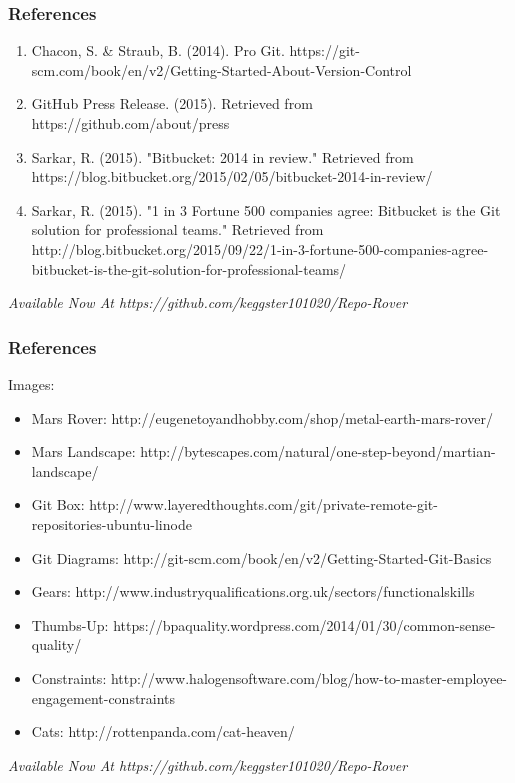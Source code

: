 \begin{frame}
    \centering
    \frametitle{References}
	\fontsize{9}{7.2}
	\begin{enumerate}
		\item Chacon, S. \& Straub, B.  (2014).  Pro Git.  https://git-scm.com/book/en/v2/Getting-Started-About-Version-Control
		\item GitHub Press Release.  (2015).  Retrieved from https://github.com/about/press
		\item Sarkar, R.  (2015).  "Bitbucket: 2014 in review."  Retrieved from https://blog.bitbucket.org/2015/02/05/bitbucket-2014-in-review/
		\item Sarkar, R.  (2015).  "1 in 3 Fortune 500 companies agree: Bitbucket is the Git solution for professional teams."  Retrieved from http://blog.bitbucket.org/2015/09/22/1-in-3-fortune-500-companies-agree-bitbucket-is-the-git-solution-for-professional-teams/
	\end{enumerate}	

	\vspace{1.5cm}	
	
	\begin{block}{}
    \begin{center}
    \emph{\Large{Available Now At \emph{https://github.com/keggster101020/Repo-Rover}}}
    \end{center}
    \end{block}
    
\end{frame}

\begin{frame}
    \centering
    \frametitle{References}
	\fontsize{9}{7.2}
	Images:
	\begin{itemize}
		\item Mars Rover: http://eugenetoyandhobby.com/shop/metal-earth-mars-rover/
		\item Mars Landscape: http://bytescapes.com/natural/one-step-beyond/martian-landscape/
		\item Git Box: http://www.layeredthoughts.com/git/private-remote-git-repositories-ubuntu-linode
		\item Git Diagrams: http://git-scm.com/book/en/v2/Getting-Started-Git-Basics
		\item Gears: http://www.industryqualifications.org.uk/sectors/functionalskills
		\item Thumbs-Up:  https://bpaquality.wordpress.com/2014/01/30/common-sense-quality/
		\item Constraints: http://www.halogensoftware.com/blog/how-to-master-employee-engagement-constraints
		\item Cats: http://rottenpanda.com/cat-heaven/
	\end{itemize}
	\begin{block}{}
    \begin{center}
    \emph{\Large{Available Now At \emph{https://github.com/keggster101020/Repo-Rover}}}
    \end{center}
    \end{block}
\end{frame}